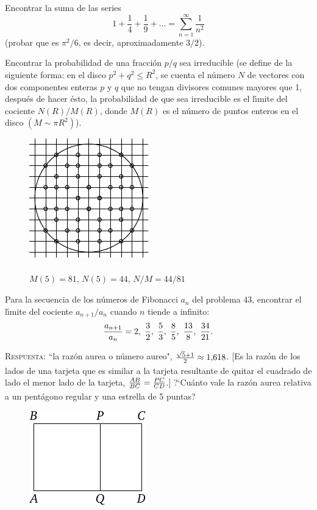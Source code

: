 \documentclass[12pt, spanish]{article}  %
\begin{document}
\bigskip
{} Encontrar la suma de las series
$$
1+ \frac{1}{4}+ \frac{1}{9}+\dots=\textstyle\sum\limits_{n=1}^{\infty} \frac{1}{n^2}
$$
(probar que es $\pi^2/6$, es decir, aproximadamente $3/2$). 

\newpage
{} Encontrar la probabilidad de una fracci\'on $p/q$ sea irreducible (se define de la siguiente forma:
en el disco $p^2+q^2 \leqslant R^2$, se cuenta el n\'umero $N$ de vectores con dos componentes enteras $p$ y $q$ que no tengan divisores comunes mayores que 1, despu\'es de hacer \'esto, la probabilidad de que sea irreducible es el l\'{\i}mite del cociente $N(R)/M(R)$, donde $M(R)$ es el n\'umero de puntos enteros en el disco $(M \sim \pi R^2)$).
\begin{figure}[h]
\footnotesize
\centering
\includegraphics{taskbook-36}\\{\ } \\
$M(5)=81$, $N(5)=44$, $N/M = 44/81$
\end{figure}

\bigskip
{} Para la secuencia de los n\'umeros de Fibonacci $a_n$ del problema 43, encontrar el l\'{\i}mite del cociente 
$a_{n+1}/a_n$ cuando $n$ tiende a infinito:\vspace{2\jot}
\[
\frac{a_{n+1}}{a_n}=2,\ \frac 32,\ \frac53, \ \frac85, \ \frac{13}8,
\ \frac{34}{21}.
\vspace{\jot}
\] 

\textsc{Respuesta:} ``la raz\'on aurea o n\'umero aureo",
$\frac{\sqrt{5}+1}{2\vphantom)} \approx 1{,}618$. [Es la raz\'on de los lados de una tarjeta que es similar a la tarjeta resultante de quitar el cuadrado de lado el menor lado de la tarjeta,
  $\frac{AB}{BC}=\frac{PC}{CD\vphantom)}$.] ?`Cu\'anto vale la raz\'on aurea relativa a un pent\'agono regular y una estrella de 5 puntas? 

\begin{figure}[h]
\centering
\includegraphics{taskbook-37}
\end{figure}
\end{document}
